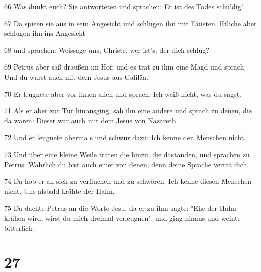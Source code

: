 \par 66 Was dünkt euch? Sie antworteten und sprachen: Er ist des Todes schuldig!
\par 67 Da spieen sie aus in sein Angesicht und schlugen ihn mit Fäusten. Etliche aber schlugen ihn ins Angesicht
\par 68 und sprachen: Weissage uns, Christe, wer ist's, der dich schlug?
\par 69 Petrus aber saß draußen im Hof; und es trat zu ihm eine Magd und sprach: Und du warst auch mit dem Jesus aus Galiläa.
\par 70 Er leugnete aber vor ihnen allen und sprach: Ich weiß nicht, was du sagst.
\par 71 Als er aber zur Tür hinausging, sah ihn eine andere und sprach zu denen, die da waren: Dieser war auch mit dem Jesus von Nazareth.
\par 72 Und er leugnete abermals und schwur dazu: Ich kenne den Menschen nicht.
\par 73 Und über eine kleine Weile traten die hinzu, die dastanden, und sprachen zu Petrus: Wahrlich du bist auch einer von denen; denn deine Sprache verrät dich.
\par 74 Da hob er an sich zu verfluchen und zu schwören: Ich kenne diesen Menschen nicht. Uns alsbald krähte der Hahn.
\par 75 Da dachte Petrus an die Worte Jesu, da er zu ihm sagte: "Ehe der Hahn krähen wird, wirst du mich dreimal verleugnen", und ging hinaus und weinte bitterlich.

\chapter{27}

